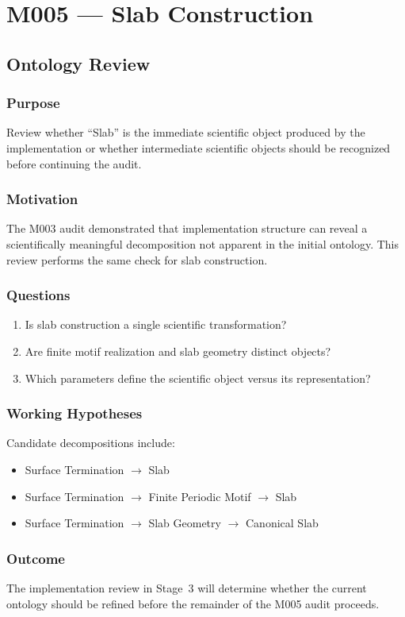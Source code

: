 \chapter{M005 --- Slab Construction}

\section{Ontology Review}

\subsection{Purpose}

Review whether ``Slab'' is the immediate scientific object produced by
the implementation or whether intermediate scientific objects should be
recognized before continuing the audit.

\subsection{Motivation}

The M003 audit demonstrated that implementation structure can reveal a
scientifically meaningful decomposition not apparent in the initial
ontology. This review performs the same check for slab construction.

\subsection{Questions}

\begin{enumerate}
\item Is slab construction a single scientific transformation?
\item Are finite motif realization and slab geometry distinct objects?
\item Which parameters define the scientific object versus its
representation?
\end{enumerate}

\subsection{Working Hypotheses}

Candidate decompositions include:

\begin{itemize}
\item Surface Termination $\rightarrow$ Slab
\item Surface Termination $\rightarrow$ Finite Periodic Motif
      $\rightarrow$ Slab
\item Surface Termination $\rightarrow$ Slab Geometry
      $\rightarrow$ Canonical Slab
\end{itemize}

\subsection{Outcome}

The implementation review in Stage~3 will determine whether the current
ontology should be refined before the remainder of the M005 audit
proceeds.
